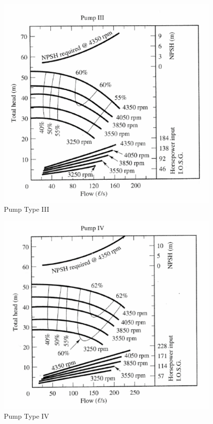 \documentclass[12pt]{article}
\begin{document}
\begin{enumerate}
\begin{figure}[h!] %
\centering
   \includegraphics[width=6in]{pump3.png}
   \caption{Pump Type III}
   \label{fig:Pump3} 
\end{figure}

\begin{figure}[h!] %
\centering
   \includegraphics[width=6in]{pump4.png}
   \caption{Pump Type IV}
   \label{fig:Pump4} 
\end{figure}

\end{enumerate}
\end{document}
